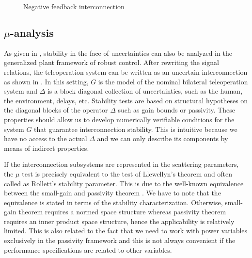 \begin{figure}%
\centering
{}
\caption{Negative feedback interconnection}%
\label{fig:lit:passint}%
\end{figure}

\subsection{\texorpdfstring{$\mu$}{mu}-analysis}
As given in , stability in the face of uncertainties can also be analyzed in the generalized plant framework 
of robust control. After rewriting the signal relations, the teleoperation system can be written as an uncertain interconnection as 
shown in . In this setting, $G$ is the model of the nominal bilateral teleoperation system and $\Delta$ 
is a block diagonal collection of uncertainties, such as the human, the environment, delays, etc. Stability tests are based on structural 
hypotheses on the diagonal blocks of the operator $\Delta$ such as gain bounds or passivity. These properties should allow us to develop 
numerically verifiable conditions for the system $G$ that guarantee interconnection stability. This is intuitive because we have no access 
to the actual $\Delta$ and we can only describe its components by means of indirect properties. 

If the interconnection subsystems are represented in the scattering parameters, the $\mu$ test is precisely equivalent to the test of
Llewellyn's theorem and often called as Rollett's stability parameter. This is due to the well-known equivalence between the small-gain 
and passivity theorem \cite{desvid}. We have to note that the equivalence is stated in terms of the stability characterization. Otherwise, 
small-gain theorem requires a normed space structure whereas passivity theorem requires an inner product space structure, hence the 
applicability is relatively limited. This is also related to the fact that we need to work with power variables exclusively in the 
passivity framework and this is not always convenient if the performance specifications are related to other variables.

